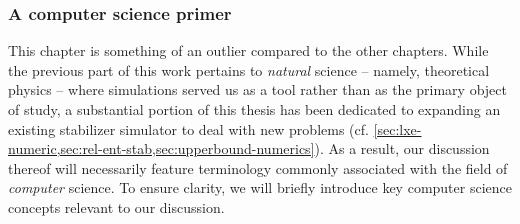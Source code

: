 \subsubsection*{A computer science primer}
This chapter is something of an outlier compared to the other chapters. While
the previous part of this work pertains to \emph{natural} science -- namely,
theoretical physics -- where simulations served us as a tool rather than as the
primary object of study, a substantial portion of this thesis has been
dedicated to expanding an existing stabilizer simulator to deal with new
problems (cf.  \cref{sec:lxe-numeric,sec:rel-ent-stab,sec:upperbound-numerics}). As a result, our
discussion thereof will necessarily feature
terminology commonly associated with the field of \emph{computer} science.
To ensure clarity, we will briefly introduce key computer science concepts
relevant to our discussion.  

